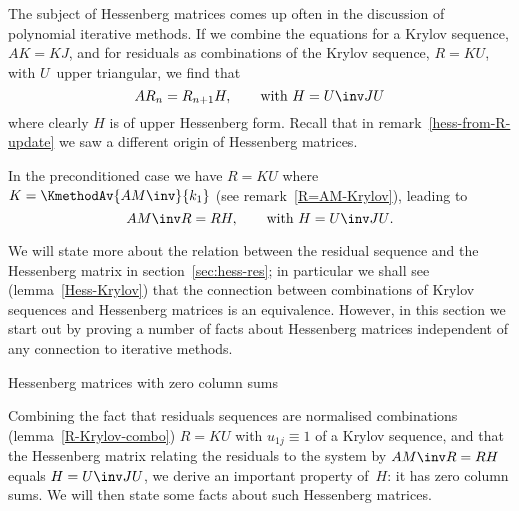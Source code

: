 The subject of Hessenberg matrices comes up often in the discussion of
polynomial iterative methods. If we combine the equations for
a Krylov sequence, $AK=KJ$,
and for residuals as combinations
of the Krylov sequence, $R=KU$,
with $U$~upper triangular, we find that
\[AR_n=R_{n+1}H,  \qquad\hbox{with $H=U\inv JU$} \]
where clearly $H$ is of upper Hessenberg form. Recall that in
remark~\ref{hess-from-R-update} we saw a different origin of
Hessenberg matrices.

In the preconditioned case we have $R=KU$ where
$K=\KmethodAv{AM\inv}{k_1}$ (see remark~\ref{R=AM-Krylov}), leading to
\begin{equation} AM\inv R=\nobreak RH,\qquad\hbox{with $H=U\inv JU$}.
        \label{eq:hess-from-u}\end{equation}

We will state more about the relation between the residual sequence
and the Hessenberg matrix in section~\ref{sec:hess-res}; in particular
we shall see (lemma~\ref{Hess-Krylov}) that the connection between
combinations of Krylov sequences and Hessenberg matrices is an
equivalence.
However, in this section we start out by proving a number of facts about
Hessenberg matrices independent of any connection to iterative
methods.

\begin{comment}
We start with a lemma that is not used anywhere in this document.
\begin{lemma}\label{H=J+U}
Let $U$ be a triangular matrix with identity diagonal,
then $H=U\inv JU$ has identity lower diagonal.
\end{lemma}
\begin{proof}
Write $U=I+\hat U_1$ and $U\inv=I+\hat U_2$ where $\hat U_i$ are
strictly upper triangular matrices. Then
\begin{eqnarray*}
     U\inv JU&=&(I+\hat U_2)J(I+\hat U_1)=(I+\hat U_2)(J+U_3)
        =J+U_4+U_5+\hat U_6\\
    &=&J+U_7\end{eqnarray*}
where $U_i$ are upper and $\hat U_i$ strictly upper triangular matrices.
\end{proof}
\end{comment}

 {Hessenberg matrices with zero column sums}

Combining the fact that residuals sequences are normalised
combinations (lemma~\ref{R-Krylov-combo}) $R=KU$ with $u_{1j}\equiv1$
of a Krylov sequence, and that the Hessenberg matrix relating the
residuals to the system by $AM\inv R=RH$ equals $H=U\inv JU$, we derive an
important property of~$H$: it has zero column sums.  We will then
state some facts about such Hessenberg matrices.


